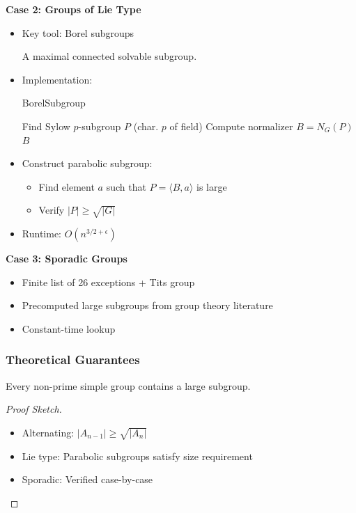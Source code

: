 \documentclass[sigconf]{acmart}
\begin{document}
\textbf{Case 2: Groups of Lie Type}
\begin{itemize}
    \item Key tool: Borel subgroups
    \begin{definition}
    A maximal connected solvable subgroup.
    \end{definition}
    
    \item Implementation:
    \begin{algorithm}[H]
    \caption{BorelSubgroup}
    \begin{algorithmic}[1]
    \STATE Find Sylow $p$-subgroup $P$ (char. $p$ of field)
    \STATE Compute normalizer $B = N_G(P)$
    \RETURN $B$
    \end{algorithmic}
    \end{algorithm}
    
    \item Construct parabolic subgroup:
    \begin{itemize}
        \item Find element $a$ such that $P = \langle B, a \rangle$ is large
        \item Verify $|P| \geq \sqrt{|G|}$
    \end{itemize}
    \item Runtime: $O(n^{3/2+\epsilon})$
\end{itemize}

\textbf{Case 3: Sporadic Groups}
\begin{itemize}
    \item Finite list of 26 exceptions + Tits group
    \item Precomputed large subgroups from group theory literature
    \item Constant-time lookup
\end{itemize}

\subsubsection{Theoretical Guarantees}
\begin{theorem}[Existence]
Every non-prime simple group contains a large subgroup.
\end{theorem}

\begin{proof}[Proof Sketch]
\begin{itemize}
    \item Alternating: $|A_{n-1}| \geq \sqrt{|A_n|}$
    \item Lie type: Parabolic subgroups satisfy size requirement
    \item Sporadic: Verified case-by-case
\end{itemize}
\end{proof}
\end{document}
